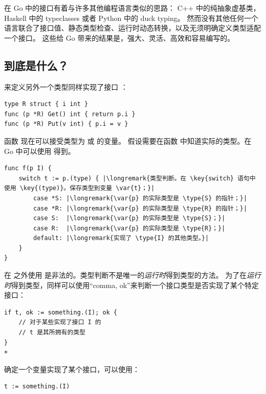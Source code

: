 在 Go 中的接口有着与许多其他编程语言类似的思路：
C++ 中的纯抽象虚基类，Haskell 中的 typeclasses 或者 Python 中的 duck typing。
然而没有其他任何一个语言联合了接口值、静态类型检查、运行时动态转换，以及无须明确定义类型适配一个接口。
这些给 Go 带来的结果是，强大、灵活、高效和容易编写的。

\subsection{到底是什么？}
来定义另外一个类型同样实现了接口 ：
\begin{lstlisting}
type R struct { i int }
func (p *R) Get() int { return p.i }
func (p *R) Put(v int) { p.i = v }
\end{lstlisting}
函数  现在可以接受类型为  或  的变量。
假设需要在函数  中知道实际的类型。在 Go 中可以使用
  得到。

\begin{lstlisting}
func f(p I) {
    switch t := p.(type) { |\longremark{类型判断。在 \key{switch} 语句中使用 \key{(type)}。保存类型到变量 \var{t}；}|
        case *S: |\longremark{\var{p} 的实际类型是 \type{S} 的指针；}|
        case *R: |\longremark{\var{p} 的实际类型是 \type{R} 的指针；}|
        case S:  |\longremark{\var{p} 的实际类型是 \type{S}；}|
        case R:  |\longremark{\var{p} 的实际类型是 \type{R}；}|
        default: |\longremark{实现了 \type{I} 的其他类型。}|
    }
}
\end{lstlisting}
\showremarks
在  之外使用  是非法的。类型判断不是唯一的\emph{运行时}得到类型的方法。
为了在\emph{运行时}得到类型，同样可以使用``comma, ok''来判断一个接口类型是否实现了某个特定接口：

\begin{lstlisting}
if t, ok := something.(I); ok {
    // 对于某些实现了接口 I 的
    // t 是其所拥有的类型
} 
+\end{lstlisting}
确定一个变量实现了某个接口，可以使用：
\begin{lstlisting}
t := something.(I)
\end{lstlisting}

